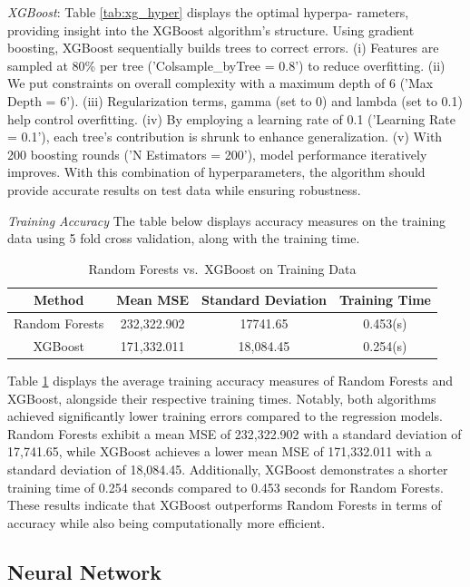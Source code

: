 \documentclass[conference]{IEEEtran}
\begin{document}
\emph{XGBoost}: Table \ref{tab:xg_hyper} displays the optimal hyperpa-
rameters, providing insight into the XGBoost algorithm’s structure. Using gradient boosting, XGBoost sequentially builds trees to correct errors. (i) Features are sampled at 80\% per tree ('Colsample\_byTree = 0.8') to reduce overfitting. (ii) We put constraints on overall complexity with a maximum depth of 6 ('Max Depth = 6'). (iii) Regularization terms, gamma (set to 0) and lambda (set to 0.1) help control overfitting. (iv) By employing a learning rate of 0.1 ('Learning Rate = 0.1'), each tree's contribution is shrunk to enhance generalization. (v) With 200 boosting rounds ('N Estimators = 200'), model performance iteratively improves. With this combination of hyperparameters, the algorithm should provide accurate results on test data while ensuring robustness.

\emph{Training Accuracy} The table below displays accuracy measures on the training data using 5 fold cross validation, along with the training time. 

\begin{table}[H]
\centering
\caption{Random Forests vs.\ XGBoost on Training Data}
\begin{tabular}{|c|c|c|c|}
\hline
Method & Mean MSE & Standard Deviation & Training Time \\
\hline
Random Forests & 232,322.902 & 17741.65 & 0.453(s) \\
\hline
XGBoost & 171,332.011 & 18,084.45 & 0.254(s) \\
\hline
\end{tabular}
\label{tab:dt_trn}
\end{table}

Table \ref{tab:dt_trn} displays the average training accuracy measures of Random Forests and XGBoost, alongside their respective training times. Notably, both algorithms achieved significantly lower training errors compared to the regression models. Random Forests exhibit a mean MSE of 232,322.902 with a standard deviation of 17,741.65, while XGBoost achieves a lower mean MSE of 171,332.011 with a standard deviation of 18,084.45. Additionally, XGBoost demonstrates a shorter training time of 0.254 seconds compared to 0.453 seconds for Random Forests. These results indicate that XGBoost outperforms Random Forests in terms of accuracy while also being computationally more efficient.

\subsection{Neural Network}
\end{document}
